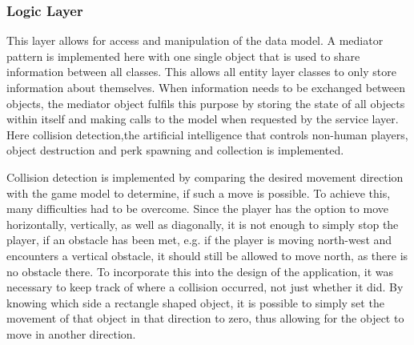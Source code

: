 \documentclass[]{article}
\begin{document}
\subsubsection{Logic Layer}
This layer allows for access and manipulation of the data model. A mediator pattern is implemented here\cite{mediator} with one single object that is used to share information between all classes. This allows all entity layer classes to only store information about themselves. When information needs to be exchanged between objects, the mediator object fulfils this purpose by storing the state of all objects within itself and making calls to the model when requested by the service layer.
Here collision detection,the artificial intelligence that controls non-human players, object destruction and perk spawning and collection is implemented.

Collision detection is implemented by comparing the desired movement direction with the game model to determine, if such a move is possible. To achieve this, many difficulties had to be overcome. Since the player has the option to move horizontally, vertically, as well as diagonally, it is not enough to simply stop the player, if an obstacle has been met, e.g. if the player is moving north-west and encounters a vertical obstacle, it should still be allowed to move north, as there is no obstacle there. To incorporate this into the design of the application, it was necessary to keep track of where a collision occurred, not just whether it did. By knowing which side a rectangle shaped object, it is possible to simply set the movement of that object in that direction to zero, thus allowing for the object to move in another direction.
\end{document}
